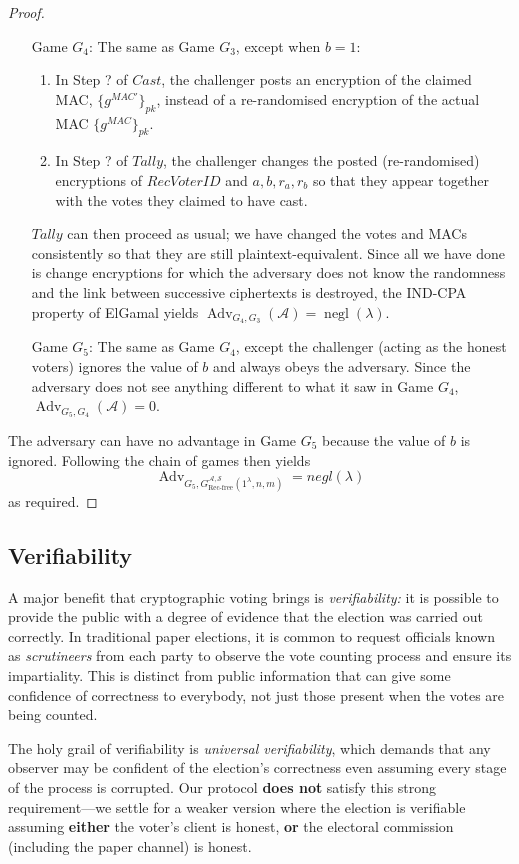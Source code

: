 \documentclass[12pt,a4paper]{article}
\DeclareMathOperator{\negl}{\text{negl}}
\DeclareMathOperator{\Adv}{\text{Adv}}
\theoremstyle{definition}
\newcommand{\receivedvid}{\mathit{RecVoterID}}
\newcommand{\Mac}{\mathit{MAC}}
\begin{document}
\begin{proof}
\begin{itemize}[leftmargin=4em]
        \item[Game] $G_4$: The same as Game $G_3$, except when $b = 1$:
        \begin{enumerate}
            \item In Step ? of $\mathit{Cast}$, the challenger posts an encryption of the claimed MAC, $\{g^{\Mac'}\}_{pk}$, instead of a re-randomised encryption of the actual MAC $\{g^\Mac\}_{pk}$.
            \item In Step ? of $\mathit{Tally}$, the challenger changes the posted (re-randomised) encryptions of $\receivedvid$ and $a, b, r_a, r_b$ so that they appear together with the votes they claimed to have cast.
        \end{enumerate}
        $\mathit{Tally}$ can then proceed as usual; we have changed the votes and MACs consistently so that they are still plaintext-equivalent. Since all we have done is change encryptions for which the adversary does not know the randomness and the link between successive ciphertexts is destroyed, the IND-CPA property of ElGamal yields $\Adv_{G_4, G_3}(\mathcal{A})=\negl(\lambda)$.
    
        \item[Game] $G_5$: The same as Game $G_4$, except the challenger (acting as the honest voters) ignores the value of $b$ and always obeys the adversary. Since the adversary does not see anything different to what it saw in Game $G_4$, $\Adv_{G_5, G_4}(\mathcal{A})=0$.
    \end{itemize}
    The adversary can have no advantage in Game $G_5$ because the value of $b$ is ignored. Following the chain of games then yields
        $$\Adv_{G_5, G^{\mathcal{A},\mathcal{S}}_\text{Rec-free}(1^\lambda,n,m)}=negl(\lambda)$$
    as required.
\end{proof}
\subsection{Verifiability}
A major benefit that cryptographic voting brings is \textit{verifiability:} it is possible to provide the public with a degree of evidence that the election was carried out correctly. In traditional paper elections, it is common to request officials known as \textit{scrutineers} from each party to observe the vote counting process and ensure its impartiality. This is distinct from public information that can give some confidence of correctness to everybody, not just those present when the votes are being counted.

The holy grail of verifiability is \textit{universal verifiability}, which demands that any observer may be confident of the election's correctness even assuming every stage of the process is corrupted. Our protocol \textbf{does not} satisfy this strong requirement---we settle for a weaker version where the election is verifiable assuming \textbf{either} the voter's client is honest, \textbf{or} the electoral commission (including the paper channel) is honest.
\end{document}
